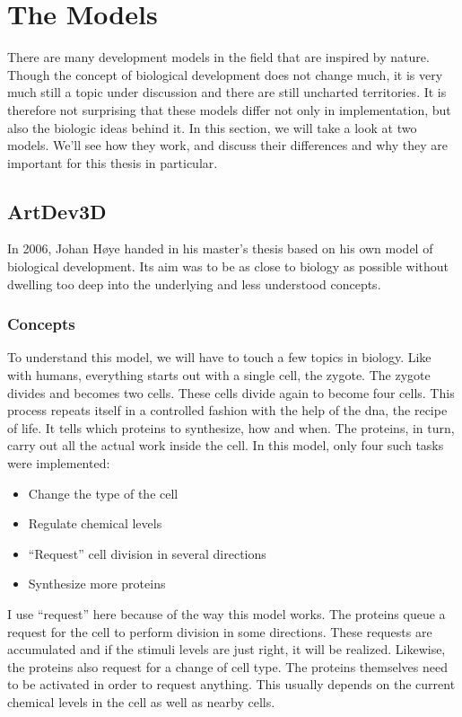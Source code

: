 \section{The Models}
There are many development models in the field that are inspired by nature. Though the concept of biological development does not change much, it is very much still a topic under discussion and there are still uncharted territories. It is therefore not surprising that these models differ not only in implementation, but also the biologic ideas behind it. In this section, we will take a look at two models. We'll see how they work, and discuss their differences and why they are important for this thesis in particular.

\subsection{ArtDev3D}
\label{sec:Models:ArtDev3D}
In 2006, Johan H{\o}ye handed in his master's thesis\cite{hoye2006} based on his own model of biological development. Its aim was to be as close to biology as possible without dwelling too deep into the underlying and less understood concepts.

\subsubsection{Concepts}
To understand this model, we will have to touch a few topics in biology. Like with humans, everything starts out with a single cell, the zygote. The zygote divides and becomes two cells. These cells divide again to become four cells. This process repeats itself in a controlled fashion with the help of the dna, the recipe of life. It tells which proteins to synthesize, how and when. The proteins, in turn, carry out all the actual work inside the cell. In this model, only four such tasks were implemented:

\begin{itemize}
	\itemsep=0pt
	\item Change the type of the cell
	\item Regulate chemical levels
	\item ``Request'' cell division in several directions
	\item Synthesize more proteins
\end{itemize}

I use ``request'' here because of the way this model works. The proteins queue a request for the cell to perform division in some directions. These requests are accumulated and if the stimuli levels are just right, it will be realized. Likewise, the proteins also request for a change of cell type. The proteins themselves need to be activated in order to request anything. This usually depends on the current chemical levels in the cell as well as nearby cells.

